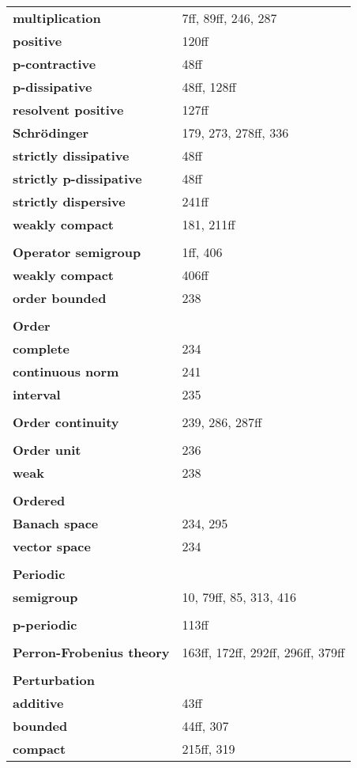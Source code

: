 \documentclass[10pt]{scrartcl}
\begin{document}
\begin{longtable}{>{\bfseries}p{6cm}p{8cm}}
\quad multiplication & 7ff, 89ff, 246, 287 \\
\quad positive & 120ff \\
\quad p-contractive & 48ff \\
\quad p-dissipative & 48ff, 128ff \\
\quad resolvent positive & 127ff \\
\quad Schrödinger & 179, 273, 278ff, 336 \\
\quad strictly dissipative & 48ff \\
\quad strictly p-dissipative & 48ff \\
\quad strictly dispersive & 241ff \\
\quad weakly compact & 181, 211ff \\
\\
\textbf{Operator semigroup} & 1ff, 406 \\
\quad weakly compact & 406ff \\
\quad order bounded & 238 \\
\\
\textbf{Order} & \\
\quad complete & 234 \\
\quad continuous norm & 241 \\
\quad interval & 235 \\
\\
\textbf{Order continuity} & 239, 286, 287ff \\
\\
\textbf{Order unit} & 236 \\
\quad weak & 238 \\
\\
\textbf{Ordered} & \\
\quad Banach space & 234, 295 \\
\quad vector space & 234 \\
\\
\textbf{Periodic} & \\
\quad semigroup & 10, 79ff, 85, 313, 416 \\
\\
\textbf{p-periodic} & 113ff \\
\\
\textbf{Perron-Frobenius theory} & 163ff, 172ff, 292ff, 296ff, 379ff \\
\\
\textbf{Perturbation} & \\
\quad additive & 43ff \\
\quad bounded & 44ff, 307 \\
\quad compact & 215ff, 319 \\

\end{longtable}
\end{document}
